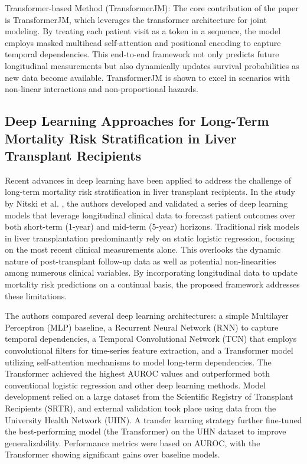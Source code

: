 \documentclass[acmsmall]{acmart}
\begin{document}
Transformer-based Method (TransformerJM):
    The core contribution of the paper is TransformerJM, which leverages the transformer architecture for joint modeling. By treating each patient visit as a token in a sequence, the model employs masked multihead self-attention and positional encoding to capture temporal dependencies. This end-to-end framework not only predicts future longitudinal measurements but also dynamically updates survival probabilities as new data become available. TransformerJM is shown to excel in scenarios with non-linear interactions and non-proportional hazards.

\subsection{Deep Learning Approaches for Long-Term Mortality Risk Stratification in Liver Transplant Recipients}

Recent advances in deep learning have been applied to address the challenge of long-term mortality risk stratification in liver transplant recipients. In the study by Nitski et al. \cite{nitski2021long}, the authors developed and validated a series of deep learning models that leverage longitudinal clinical data to forecast patient outcomes over both short-term (1-year) and mid-term (5-year) horizons. Traditional risk models in liver transplantation predominantly rely on static logistic regression, focusing on the most recent clinical measurements alone. This overlooks the dynamic nature of post-transplant follow-up data as well as potential non-linearities among numerous clinical variables. By incorporating longitudinal data to update mortality risk predictions on a continual basis, the proposed framework addresses these limitations.

The authors compared several deep learning architectures: a simple Multilayer Perceptron (MLP) baseline, a Recurrent Neural Network (RNN) to capture temporal dependencies, a Temporal Convolutional Network (TCN) that employs convolutional filters for time-series feature extraction, and a Transformer model utilizing self-attention mechanisms to model long-term dependencies. The Transformer achieved the highest AUROC values and outperformed both conventional logistic regression and other deep learning methods. Model development relied on a large dataset from the Scientific Registry of Transplant Recipients (SRTR), and external validation took place using data from the University Health Network (UHN). A transfer learning strategy further fine-tuned the best-performing model (the Transformer) on the UHN dataset to improve generalizability. Performance metrics were based on AUROC, with the Transformer showing significant gains over baseline models.
\end{document}
